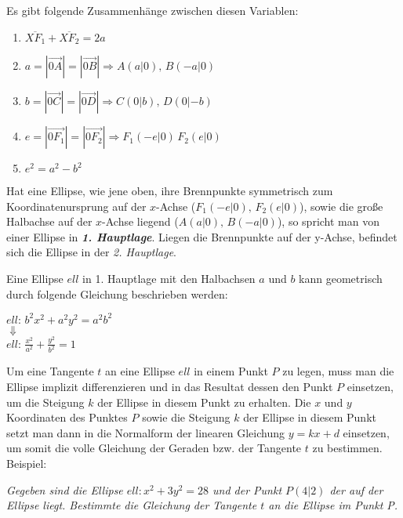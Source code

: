 Es gibt folgende Zusammenh\"{a}nge zwischen diesen Variablen:

\begin{enumerate}
	\item $\overbar{XF_{1}} + \overbar{XF_{2}} = 2a$
	\item $a = |\vec{0A}| = |\vec{0B}| \Rightarrow A (a | 0),\, B (-a | 0)$
	\item $b = |\vec{0C}| = |\vec{0D}| \Rightarrow C (0 | b),\, D (0 | -b)$
	\item $e = |\vec{0F_{1}}| = |\vec{0F_{2}}| \Rightarrow F_{1} (-e | 0)\, F_{2} (e | 0)$
	\item $e^2 = a^2 - b^2$
\end{enumerate}

Hat eine Ellipse, wie jene oben, ihre Brennpunkte symmetrisch zum Koordinatenursprung auf der $x$-Achse ($F_{1} (-e | 0),\, F_{2} (e | 0)$), sowie die gro\ss{}e Halbachse auf der $x$-Achse liegend ($A (a | 0),\, B (-a | 0)$), so spricht man von einer Ellipse in \textbf{\emph{1. Hauptlage}}. Liegen die Brennpunkte auf der y-Achse, befindet sich die Ellipse in der \emph{2. Hauptlage}. 

\pagebreak

Eine Ellipse $ell$ in 1. Hauptlage mit den Halbachsen $a$ und $b$ kann geometrisch durch folgende Gleichung beschrieben werden:

\begin{table}[h!]
	\begin{center}
		$ell:\, b^2x^2 + a^2y^2 = a^2b^2$\\
		$\Downarrow$\\
		$ell:\, \frac{x^2}{a^2} + \frac{y^2}{b^2} = 1$
	\end{center}
\end{table}



Um eine Tangente $t$ an eine Ellipse $ell$ in einem Punkt $P$ zu legen, muss man die Ellipse implizit differenzieren und in das Resultat dessen den Punkt $P$ einsetzen, um die Steigung $k$ der Ellipse in diesem Punkt zu erhalten. Die $x$ und $y$ Koordinaten des Punktes $P$ sowie die Steigung $k$ der Ellipse in diesem Punkt setzt man dann in die Normalform der linearen Gleichung $y = kx + d$ einsetzen, um somit die volle Gleichung der Geraden bzw. der Tangente $t$ zu bestimmen. Beispiel:

\emph{Gegeben sind die Ellipse $ell: x^2 + 3y^2 = 28$ und der Punkt $P(4 | 2)$ der auf der Ellipse liegt. Bestimmte die Gleichung der Tangente $t$ an die Ellipse im Punkt P.}

